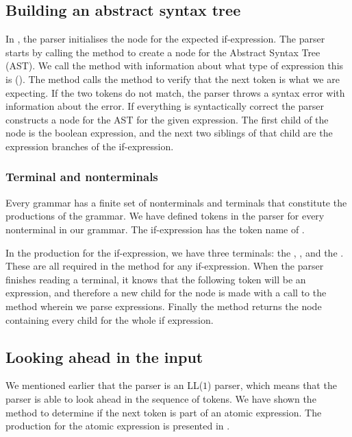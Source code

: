\subsection{Building an abstract syntax tree}
In , the parser initialises the node for the
expected if-expression. The parser starts by calling the method
 to create a node for the Abstract Syntax Tree (AST).
We call the method with information about what type of expression this
is (). The method calls the  method
to verify that the next token is what we are expecting. If the two
tokens do not match, the parser throws a syntax error with information
about the error. If everything is syntactically correct the parser
constructs a node for the AST for the given expression. The first child
of the node is the boolean expression, and the next two siblings of that
child are the expression branches of the if-expression.

\subsubsection{Terminal and nonterminals}
Every grammar has a finite set of nonterminals and terminals that
constitute the productions of the grammar. We have defined tokens in the
parser for every nonterminal in our grammar. The if-expression has the
token name of .

In the production for the if-expression, we have three terminals: the ,
, and the . These are all required in the method for any
if-expression. When the parser finishes reading a terminal, it knows that the
following token will be an expression, and therefore a new child for the node is
made with a call to the  method wherein we parse
expressions. Finally the method returns the node containing every child for the
whole if expression.

\subsection{Looking ahead in the input}
We mentioned earlier that the parser is an LL($1$) parser, which means that the
parser is able to look ahead in the sequence of tokens. We have shown the
 method to determine if the next token is part of an
atomic expression. The production for the atomic expression is presented in
.

